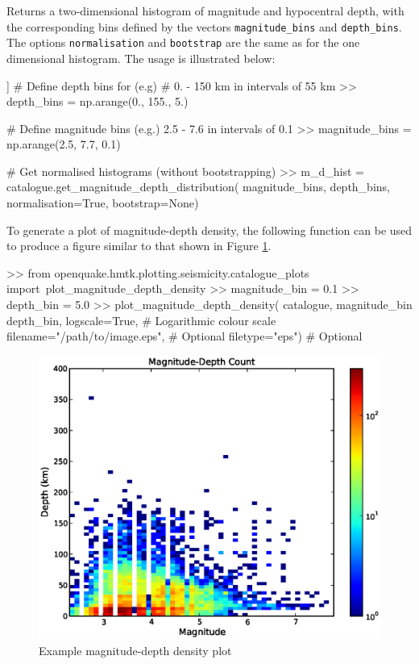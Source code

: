 \begin{itemize}
Returns a two-dimensional histogram of magnitude and hypocentral depth, with the corresponding bins defined by the vectors \verb=magnitude_bins= and \verb=depth_bins=. The options \verb=normalisation= and \verb=bootstrap= are the same as for the one dimensional histogram. The usage is illustrated below:

\begin{python}[frame=single]]
# Define depth bins for (e.g) 
# 0. - 150 km in intervals of 55 km
>> depth_bins = np.arange(0., 155., 5.)

# Define magnitude bins (e.g.) 2.5 - 7.6 in intervals of 0.1
>> magnitude_bins = np.arange(2.5, 7.7, 0.1)

# Get normalised histograms (without bootstrapping)
>> m_d_hist = catalogue.get_magnitude_depth_distribution(
    magnitude_bins,
    depth_bins,
    normalisation=True,
    bootstrap=None)
\end{python}

To generate a plot of magnitude-depth density, the following function can be used to produce a figure similar to that shown in Figure \ref{fig:mag_depth_density}.

\begin{python}[frame=single]
>> from openquake.hmtk.plotting.seismicity.catalogue_plots import\
     plot_magnitude_depth_density
>> magnitude_bin = 0.1
>> depth_bin = 5.0 
>> plot_magnitude_depth_density(
    catalogue,
    magnitude_bin
    depth_bin,
    logscale=True, \# Logarithmic colour scale
    filename="/path/to/image.eps", \# Optional
    filetype="eps")   \# Optional
\end{python}

\begin{figure}[htb]
  \centering
      \includegraphics[trim=10mm 10mm 10mm 10mm, clip, width=14cm]{./figures/magnitude_depth_density.eps}
  \caption{Example magnitude-depth density plot}
  \label{fig:mag_depth_density}
\end{figure}


\end{itemize}
